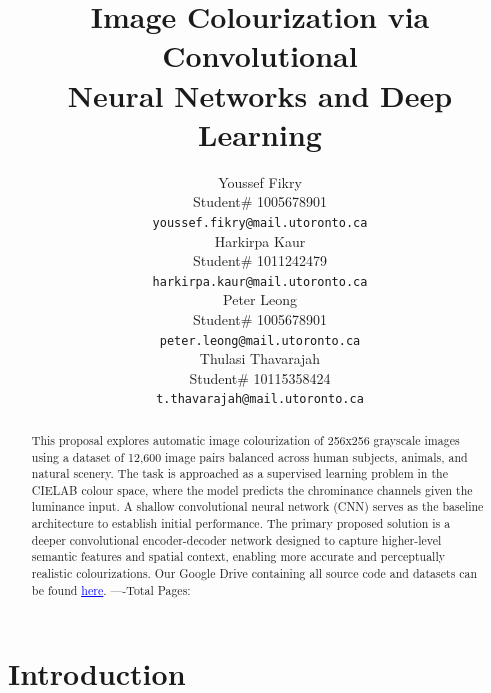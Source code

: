 \documentclass{article} %
\title{Image Colourization via Convolutional \\
Neural Networks and Deep Learning}
\author{Youssef Fikry  \\
Student\# 1005678901\\
\texttt{youssef.fikry@mail.utoronto.ca} \\
\And Harkirpa Kaur  \\
Student\# 1011242479 \\
\texttt{harkirpa.kaur@mail.utoronto.ca} \\
\AND
Peter Leong \\
Student\# 1005678901 \\
\texttt{peter.leong@mail.utoronto.ca} \\
\And
Thulasi Thavarajah \\
Student\# 10115358424 \\
\texttt{t.thavarajah@mail.utoronto.ca} \\
\AND
}
\begin{document}
\maketitle

\begin{abstract}
This proposal explores automatic image colourization of 256x256 grayscale images using a dataset of 12,600 image pairs balanced across human subjects, animals, and natural scenery. 
The task is approached as a supervised learning problem in the CIELAB colour space, where the model predicts the chrominance channels given the luminance input. A shallow convolutional 
neural network (CNN) serves as the baseline architecture to establish initial performance. The primary proposed solution is a deeper convolutional encoder-decoder network designed to 
capture higher-level semantic features and spatial context, enabling more accurate and perceptually realistic colourizations. Our Google Drive containing all source code and datasets 
can be found \href{https://drive.google.com/drive/folders/1cV1NhlQ8UTk_CgJdwhqeRu0z5xE85ZsI?usp=sharing}{\textcolor{blue}{\uline{here}}}.
----Total Pages: \pageref{last_page}
\end{abstract}


\section{Introduction}



\label{last_page}

\newpage



\newpage
\end{document}
